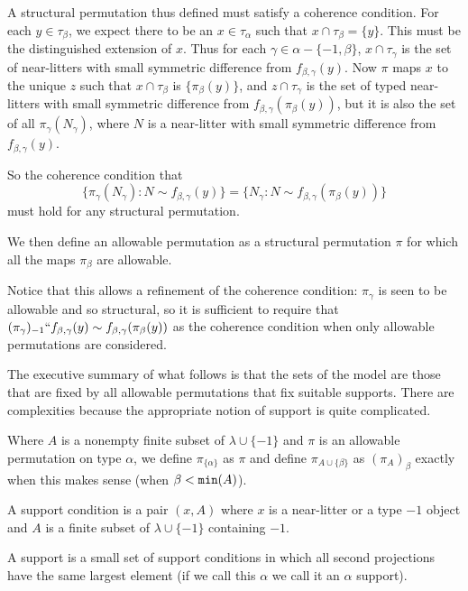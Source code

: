 \documentclass{slides}
\begin{document}
\begin{slide}

A structural permutation thus defined must satisfy a coherence condition.  For each $y \in \tau_{\beta}$, we expect there to be an $x \in \tau_\alpha$ such that $x \cap \tau_\beta = \{y\}$.  This must be the distinguished extension of $x$.  Thus for each $\gamma \in \alpha - \{-1,\beta\}$, $x \cap \tau_\gamma$ is the set of near-litters with small symmetric difference from $f_{\beta,\gamma}(y)$.   Now $\pi$ maps
$x$ to the unique $z$ such that $x \cap \tau_{\beta}$ is $\{\pi_{\beta}(y)\}$, and $z \cap \tau_{\gamma}$ is the set of typed near-litters with small symmetric difference from $f_{\beta,\gamma}(\pi_\beta(y))$, but it is also
the set of all $\pi_\gamma(N_\gamma)$, where $N$ is a near-litter with small symmetric difference from $f_{\beta,\gamma}(y)$.

So the coherence condition that {\small $$\{\pi_\gamma(N_\gamma):N \sim f_{\beta,\gamma}(y)\}= \{N_\gamma:N \sim f_{\beta,\gamma}(\pi_\beta(y))\}$$} must hold for any structural permutation.

\end{slide}

\begin{slide}

We then define an allowable permutation as a structural permutation $\pi$ for which all the maps $\pi_\beta$ are allowable.

Notice that this allows a refinement of the coherence condition:  $\pi_\gamma$ is seen to be allowable and so structural, so it is sufficient to require that  $(\pi_{\gamma})_{-1}``f_{\beta,\gamma}(y) \sim f_{\beta,\gamma}(\pi_\beta(y))$ as the coherence condition when only allowable permutations are considered.

\end{slide}

\begin{slide}

The executive summary of what follows is that the sets of the model are those that are fixed by all allowable permutations that fix suitable supports.  There are complexities because the appropriate notion of support
is quite complicated.

Where $A$ is a nonempty finite subset of $\lambda \cup \{-1\}$ and $\pi$ is an allowable permutation on type $\alpha$, we define $\pi_{\{\alpha\}}$ as $\pi$ and define $\pi_{A \cup \{\beta\}}$ as $(\pi_A)_\beta$ exactly
when this makes sense (when $\beta<{\tt min}(A)$).

A support condition is a pair $(x,A)$ where $x$ is a near-litter or a type $-1$ object and $A$ is a finite subset of $\lambda \cup \{-1\}$ containing $-1$.

A support is a small set of support conditions in which all second projections have the same largest element (if we call this $\alpha$ we call it an $\alpha$ support).

\end{slide}
\end{document}
